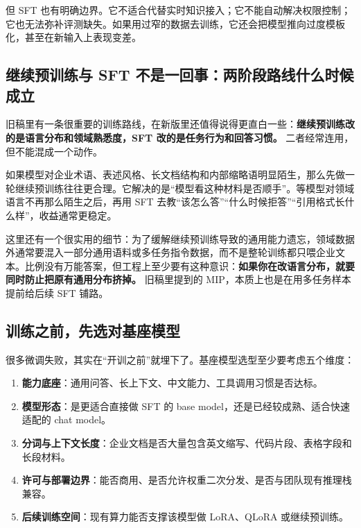 但 SFT 也有明确边界。它不适合代替实时知识接入；它不能自动解决权限控制；它也无法弥补评测缺失。如果用过窄的数据去训练，它还会把模型推向过度模板化，甚至在新输入上表现变差。

\subsection{继续预训练与 SFT 不是一回事：两阶段路线什么时候成立}
旧稿里有一条很重要的训练路线，在新版里还值得说得更直白一些：\textbf{继续预训练改的是语言分布和领域熟悉度，SFT 改的是任务行为和回答习惯。} 二者经常连用，但不能混成一个动作。

如果模型对企业术语、表述风格、长文档结构和内部缩略语明显陌生，那么先做一轮继续预训练往往更合理。它解决的是“模型看这种材料是否顺手”。等模型对领域语言不再那么陌生之后，再用 SFT 去教“该怎么答”“什么时候拒答”“引用格式长什么样”，收益通常更稳定。

这里还有一个很实用的细节：为了缓解继续预训练导致的通用能力遗忘，领域数据外通常要混入一部分通用语料或多任务指令数据，而不是整轮训练都只喂企业文本。比例没有万能答案，但工程上至少要有这种意识：\textbf{如果你在改语言分布，就要同时防止把原有通用分布挤掉。} 旧稿里提到的 MIP，本质上也是在用多任务样本提前给后续 SFT 铺路。

\subsection{训练之前，先选对基座模型}
很多微调失败，其实在“开训之前”就埋下了。基座模型选型至少要考虑五个维度：
\begin{enumerate}
  \item \textbf{能力底座}：通用问答、长上下文、中文能力、工具调用习惯是否达标。
  \item \textbf{模型形态}：是更适合直接做 SFT 的 base model，还是已经较成熟、适合快速适配的 chat model。
  \item \textbf{分词与上下文长度}：企业文档是否大量包含英文缩写、代码片段、表格字段和长段材料。
  \item \textbf{许可与部署边界}：能否商用、是否允许权重二次分发、是否与团队现有推理栈兼容。
  \item \textbf{后续训练空间}：现有算力能否支撑该模型做 LoRA、QLoRA 或继续预训练。
\end{enumerate}

